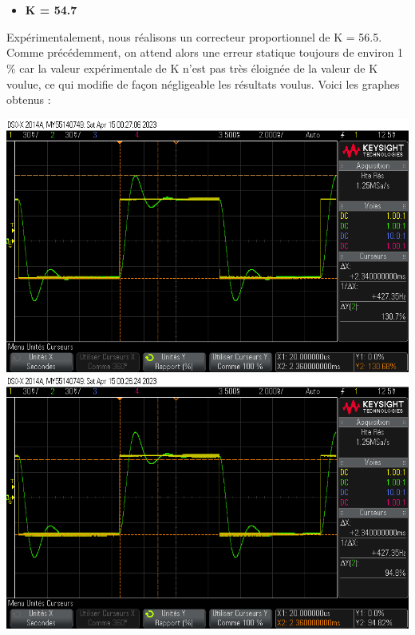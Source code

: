\documentclass[12pt]{article}
\begin{document}
\\\\\\\\\\\\\\\\\\\\\\\\
\begin{itemize}
\item \bf \large K = 54.7
\end{itemize}
Expérimentalement, nous réalisons un correcteur proportionnel de K = 56.5. Comme précédemment, on attend alors une erreur statique toujours de environ 1$\%$ car la valeur expérimentale de K n'est pas très éloignée de la valeur de K voulue, ce qui modifie de façon négligeable les résultats voulus. Voici les graphes obtenus : 
\begin{center}
    \includegraphics[width = 16 cm]{TP3/Syst_1/P/14_04_2023_depk55.png}
    \includegraphics[width = 16 cm]{TP3/Syst_1/P/14_04_2023_tr_k55.png}
\end{center}
\end{document}

